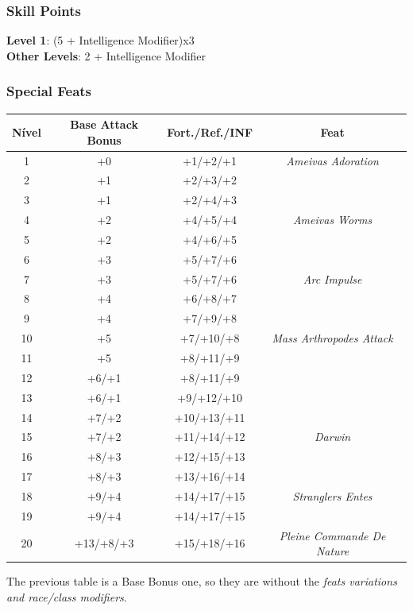 \documentclass[ letterpaper,12pt]{article}
\begin{document}
\subsubsection{Skill Points}
{\bf Level 1}: (5 + Intelligence Modifier)x3\\
{\bf Other Levels}: 2 + Intelligence Modifier\\

\subsubsection{Special Feats}

\begin{center} \begin{tabular}{|c||c|c|c|}
\hline
{\bf Nível}&{\bf Base Attack Bonus}&{\bf Fort./Ref./INF}&{\bf Feat}\\
\hline
1&+0&+1/+2/+1&{\it Ameivas Adoration}\\
\hline
2&+1&+2/+3/+2&\\
\hline
3&+1&+2/+4/+3&\\
\hline
4&+2&+4/+5/+4&{\it Ameivas Worms}\\
\hline
5&+2&+4/+6/+5&{\it }\\
\hline
6&+3&+5/+7/+6&\\
\hline
7&+3&+5/+7/+6&{\it Arc Impulse}\\
\hline
8&+4&+6/+8/+7&\\
\hline
9&+4&+7/+9/+8&\\
\hline
10&+5&+7/+10/+8&{\it Mass Arthropodes Attack}\\
\hline
11&+5&+8/+11/+9&\\
\hline
12&+6/+1&+8/+11/+9&\\
\hline
13&+6/+1&+9/+12/+10&\\
\hline
14&+7/+2&+10/+13/+11&\\
\hline
15&+7/+2&+11/+14/+12&{\it Darwin }\\
\hline
16&+8/+3&+12/+15/+13&\\
\hline
17&+8/+3&+13/+16/+14&\\
\hline
18&+9/+4&+14/+17/+15&{\it Stranglers Entes}\\
\hline
19&+9/+4&+14/+17/+15&\\
\hline
20&+13/+8/+3&+15/+18/+16&{\it Pleine Commande De Nature }\\
\hline
\end{tabular} \end{center}

The previous table is a Base Bonus one, so they are without the {\it feats variations and race/class modifiers}.\\
\end{document}
